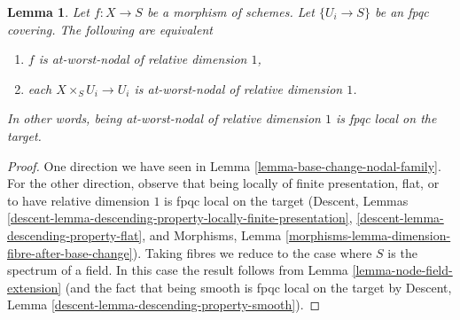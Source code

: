 \documentclass[10pt,a4paper]{amsart}
\theoremstyle{plain}
\newtheorem{lemma}[subsection]{Lemma}
\theoremstyle{definition}
\theoremstyle{remark}
\numberwithin{equation}{subsection}
\begin{document}
\begin{lemma}
\label{lemma-nodal-family-fpqc-local-target}
Let $f : X \to S$ be a morphism of schemes. Let $\{U_i \to S\}$
be an fpqc covering. The following are equivalent
\begin{enumerate}
\item $f$ is at-worst-nodal of relative dimension $1$,
\item each $X \times_S U_i \to U_i$ is at-worst-nodal of relative
dimension $1$.
\end{enumerate}
In other words, being at-worst-nodal of relative dimension $1$
is fpqc local on the target.
\end{lemma}

\begin{proof}
One direction we have seen in Lemma \ref{lemma-base-change-nodal-family}.
For the other direction, observe that being locally of finite
presentation, flat, or to have relative dimension $1$
is fpqc local on the target
(Descent, Lemmas
\ref{descent-lemma-descending-property-locally-finite-presentation},
\ref{descent-lemma-descending-property-flat}, and
Morphisms, Lemma \ref{morphisms-lemma-dimension-fibre-after-base-change}).
Taking fibres we reduce
to the case where $S$ is the spectrum of a field. In this case the
result follows from Lemma \ref{lemma-node-field-extension}
(and the fact that being smooth is fpqc local on the target by
Descent, Lemma \ref{descent-lemma-descending-property-smooth}).
\end{proof}
\end{document}
